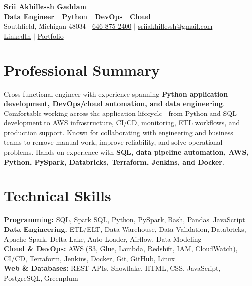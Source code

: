 \documentclass[letterpaper,10pt]{article}
\begin{document}
\fontsize{9.35pt}{10.45pt}\selectfont

\begin{center}
    {\LARGE \textbf{Srii Akhillessh Gaddam}} \\[-1pt]
    \textbf{Data Engineer | Python | DevOps | Cloud} \\[2pt]
    Southfield, Michigan 48034 $|$
    \href{tel:6468752400}{646-875-2400} $|$
    \href{mailto:sriiakhillessh@gmail.com}{sriiakhillessh@gmail.com} \\[1pt]
    \href{https://www.linkedin.com/in/srii-akhiilessh-gaddam-b48668191/}{LinkedIn} $|$
    \href{https://sriiakhillesshg.github.io/portfolio/}{Portfolio}
\end{center}
\vspace{-8pt}

\section{Professional Summary}
\small{Cross-functional engineer with experience spanning \textbf{Python application development, DevOps/cloud automation, and data engineering}. Comfortable working across the application lifecycle - from Python and SQL development to AWS infrastructure, CI/CD, monitoring, ETL workflows, and production support. Known for collaborating with engineering and business teams to remove manual work, improve reliability, and solve operational problems. Hands-on experience with \textbf{SQL, data pipeline automation, AWS, Python, PySpark, Databricks, Terraform, Jenkins, and Docker}.}

\section{Technical Skills}
\small{
\textbf{Programming:} SQL, Spark SQL, Python, PySpark, Bash, Pandas, JavaScript \\
\textbf{Data Engineering:} ETL/ELT, Data Warehouse, Data Validation, Databricks, Apache Spark, Delta Lake, Auto Loader, Airflow, Data Modeling \\
\textbf{Cloud \& DevOps:} AWS (S3, Glue, Lambda, Redshift, IAM, CloudWatch), CI/CD, Terraform, Jenkins, Docker, Git, GitHub, Linux \\
\textbf{Web \& Databases:} REST APIs, Snowflake, HTML, CSS, JavaScript, PostgreSQL, Greenplum
}
\end{document}
